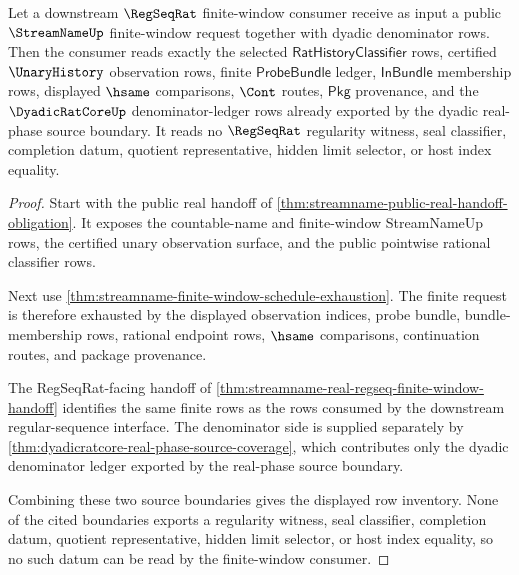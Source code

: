 \begin{theorem}
\label{thm:streamname-regseqrat-denominator-source-exhaustion}
Let a downstream $\RegSeqRat$ finite-window consumer receive as input a public
$\StreamNameUp$ finite-window request together with dyadic denominator rows.
Then the consumer reads exactly the selected $\mathsf{RatHistoryClassifier}$
rows, certified $\UnaryHistory$ observation rows, finite
$\mathsf{ProbeBundle}$ ledger, $\mathsf{InBundle}$ membership rows, displayed
$\hsame$ comparisons, $\Cont$ routes, $\mathsf{Pkg}$ provenance, and the
$\DyadicRatCoreUp$ denominator-ledger rows already exported by the dyadic
real-phase source boundary. It reads no $\RegSeqRat$ regularity witness, seal
classifier, completion datum, quotient representative, hidden limit selector,
or host index equality.
\end{theorem}
\begin{proof}
Start with the public real handoff of
\autoref{thm:streamname-public-real-handoff-obligation}. It exposes the
countable-name and finite-window StreamNameUp rows, the certified unary
observation surface, and the public pointwise rational classifier rows.

Next use \autoref{thm:streamname-finite-window-schedule-exhaustion}. The
finite request is therefore exhausted by the displayed observation indices,
probe bundle, bundle-membership rows, rational endpoint rows, $\hsame$
comparisons, continuation routes, and package provenance.

The RegSeqRat-facing handoff of
\autoref{thm:streamname-real-regseq-finite-window-handoff} identifies the same
finite rows as the rows consumed by the downstream regular-sequence interface.
The denominator side is supplied separately by
\autoref{thm:dyadicratcore-real-phase-source-coverage}, which contributes only
the dyadic denominator ledger exported by the real-phase source boundary.

Combining these two source boundaries gives the displayed row inventory. None
of the cited boundaries exports a regularity witness, seal classifier,
completion datum, quotient representative, hidden limit selector, or host
index equality, so no such datum can be read by the finite-window consumer.
\end{proof}

